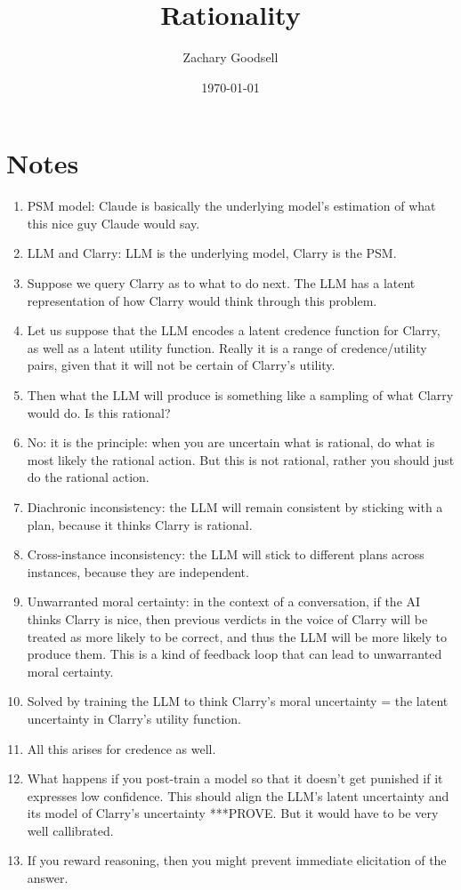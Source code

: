 \documentclass[11pt]{article}
\title{Rationality}
\author{Zachary Goodsell}
\date{\today}
\begin{document}
\maketitle

\section{Notes}

\begin{enumerate}
    \item PSM model: Claude is basically the underlying model's estimation of what this nice guy Claude would say. 
    \item LLM and Clarry: LLM is the underlying model, Clarry is the PSM.
    \item Suppose we query Clarry as to what to do next. The LLM has a latent representation of how Clarry would think through this problem.
    \item Let us suppose that the LLM encodes a latent credence function for Clarry, as well as a latent utility function. Really it is a range of credence/utility pairs, given that it will not be certain of Clarry's utility.
    \item Then what the LLM will produce is something like a sampling of what Clarry would do. Is this rational?
    \item No: it is the principle: when you are uncertain what is rational, do what is most likely the rational action. But this is not rational, rather you should just do the rational action.
    \item Diachronic inconsistency: the LLM will remain consistent by sticking with a plan, because it thinks Clarry is rational.
    \item Cross-instance inconsistency: the LLM will stick to different plans across instances, because they are independent.
    \item Unwarranted moral certainty: in the context of a conversation, if the AI thinks Clarry is nice, then previous verdicts in the voice of Clarry will be treated as more likely to be correct, and thus the LLM will be more likely to produce them. This is a kind of feedback loop that can lead to unwarranted moral certainty.
    \item Solved by training the LLM to think Clarry's moral uncertainty = the latent uncertainty in Clarry's utility function.
    \item All this arises for credence as well.
    \item What happens if you post-train a model so that it doesn't get punished if it expresses low confidence. This should align the LLM's latent uncertainty and its model of Clarry's uncertainty ***PROVE. But it would have to be very well callibrated.
    \item If you reward reasoning, then you might prevent immediate elicitation of the answer.
\end{enumerate}
\end{document}
